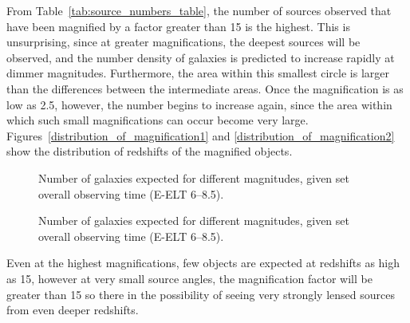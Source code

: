 			From Table~\ref{tab:source_numbers_table}, the number of sources observed that have been magnified by a factor greater than 15 is the highest. This is unsurprising, since at greater magnifications, the deepest sources will be observed, and the number density of galaxies is predicted to increase rapidly at dimmer magnitudes. Furthermore, the area within this smallest circle is larger than the differences between the intermediate areas. Once the magnification is as low as 2.5, however, the number begins to increase again, since the area within which such small magnifications can occur become very large. Figures~\ref{distribution_of_magnification1} and \ref{distribution_of_magnification2} show the distribution of redshifts of the magnified objects.
			\begin{figure}[!htbp]
	        	\begin{minipage}[c]{0.5\linewidth}
					\centering
						\begingroup{}
							\resizebox{0.9\textwidth}{!}{%
								
							}\endgroup
					\caption{Number of galaxies expected for different magnitudes, given set overall observing time (E-ELT 6--8.5).\label{fig:distribution_of_magnification1}}
				\end{minipage}
	        	\begin{minipage}[c]{0.5\linewidth}
					\centering
						\begingroup{}
							\resizebox{0.9\textwidth}{!}{%
								
							}\endgroup
					\caption{Number of galaxies expected for different magnitudes, given set overall observing time (E-ELT 6--8.5).\label{fig:distribution_of_magnification2}}
				\end{minipage}
			\end{figure}

			Even at the highest magnifications, few objects are expected at redshifts as high as 15, however at very small source angles, the magnification factor will be greater than 15 so there in the possibility of seeing very strongly lensed sources from even deeper redshifts.

